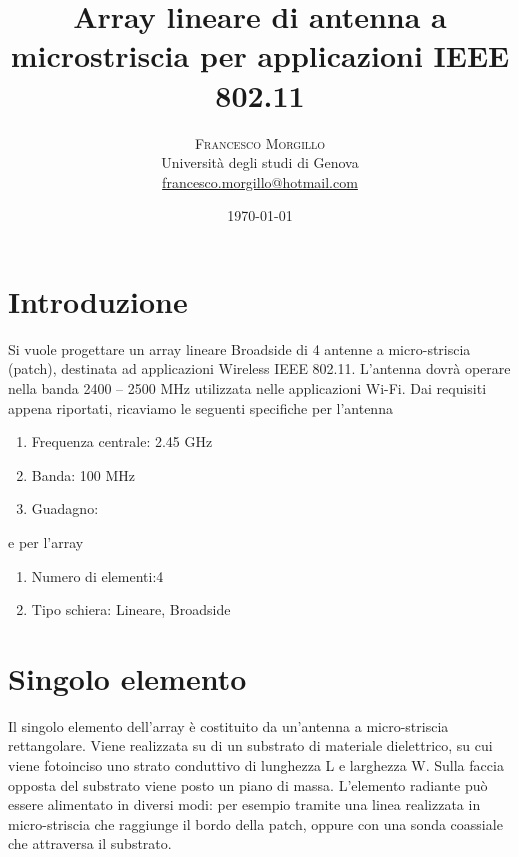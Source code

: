 \documentclass[twoside,twocolumn]{article}
\title{Array lineare di antenna a microstriscia per applicazioni IEEE 802.11} %
\author{%
\textsc{Francesco Morgillo}\\[1ex] %
\normalsize Università degli studi di Genova \\ %
\normalsize \href{mailto:francesco.morgillo@hotmail.com}{francesco.morgillo@hotmail.com} %
}
\date{\today} %
\begin{document}
\renewcommand{\refname}{Bibliografia}
\maketitle


\section{Introduzione}


Si vuole progettare un array lineare Broadside di 4 antenne a micro-striscia (patch), destinata ad applicazioni Wireless IEEE 802.11.
L'antenna dovrà operare nella banda 2400 – 2500 MHz utilizzata nelle applicazioni Wi-Fi.
Dai requisiti appena riportati, ricaviamo le seguenti specifiche per l'antenna

\begin{enumerate}[noitemsep] %
\item Frequenza centrale: 2.45 GHz
\item Banda: 100 MHz
\item Guadagno:  
\end{enumerate}
 e per l'array
 \begin{enumerate}[noitemsep] %
\item Numero di elementi:4 
\item Tipo schiera: Lineare, Broadside
\end{enumerate}



\section{Singolo elemento}
Il singolo elemento dell'array è costituito da un'antenna a micro-striscia rettangolare.
Viene realizzata su di un substrato di materiale dielettrico, su cui viene fotoinciso uno strato conduttivo di lunghezza L e larghezza W. Sulla faccia opposta del substrato viene posto un piano di massa. L'elemento radiante può essere alimentato in diversi modi: per esempio tramite una linea realizzata in micro-striscia che raggiunge il bordo della patch, oppure con una sonda coassiale che attraversa il substrato.
\end{document}
